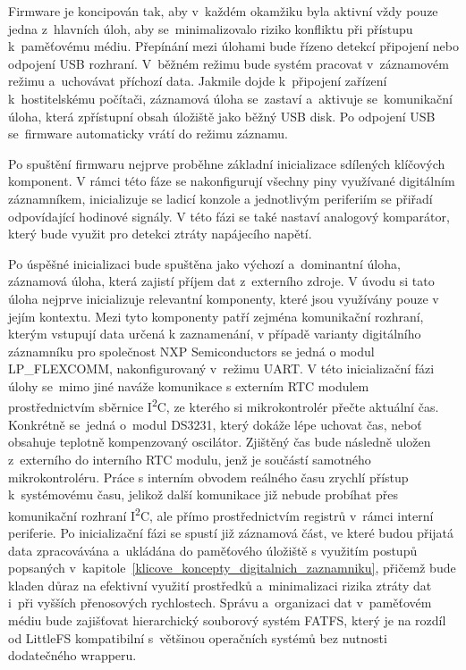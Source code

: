 Firmware je koncipován tak, aby v~každém okamžiku byla aktivní vždy pouze jedna z~hlavních úloh, aby se~minimalizovalo riziko konfliktu při přístupu k~paměťovému médiu. Přepínání mezi úlohami bude řízeno detekcí připojení nebo odpojení USB rozhraní. V~běžném režimu bude systém pracovat v~záznamovém režimu a~uchovávat příchozí data. Jakmile dojde k~připojení zařízení k~hostitelskému počítači, záznamová úloha se~zastaví a~aktivuje se~komunikační úloha, která zpřístupní obsah úložiště jako běžný USB disk. Po odpojení USB se~firmware automaticky vrátí do režimu záznamu.

Po spuštění firmwaru nejprve proběhne základní inicializace sdílených klíčových komponent. V rámci této fáze se nakonfigurují všechny piny využívané digitálním záznamníkem, inicializuje se ladicí konzole a jednotlivým periferiím se přiřadí odpovídající hodinové signály. V této fázi se také nastaví analogový komparátor, který bude využit pro detekci ztráty napájecího napětí.

Po úspěšné inicializaci bude spuštěna jako výchozí a~dominantní úloha, záznamová úloha, která zajistí příjem dat z~externího zdroje. V úvodu si tato úloha nejprve inicializuje relevantní komponenty, které jsou využívány pouze v jejím kontextu. Mezi tyto komponenty patří zejména komunikační rozhraní, kterým vstupují data určená k zaznamenání, v případě varianty digitálního záznamníku pro společnost NXP Semiconductors se jedná o modul LP\_FLEXCOMM, nakonfigurovaný v~režimu UART. V této inicializační fázi úlohy se~mimo jiné naváže komunikace s externím RTC modulem prostřednictvím sběrnice I\textsuperscript{2}C, ze kterého si mikrokontrolér přečte aktuální čas. Konkrétně se~jedná o~modul DS3231, který dokáže lépe uchovat čas, neboť obsahuje teplotně kompenzovaný oscilátor. Zjištěný čas bude následně uložen z~externího do interního RTC modulu, jenž je součástí samotného mikrokontroléru. Práce s interním obvodem reálného času zrychlí přístup k~systémovému času, jelikož další komunikace již nebude probíhat přes komunikační rozhraní I\textsuperscript{2}C, ale přímo prostřednictvím registrů v~rámci interní periferie. Po inicializační fázi se spustí již záznamová část, ve které budou přijatá data zpracovávána a~ukládána do paměťového úložiště s využitím postupů popsaných v~kapitole~\ref{klicove_koncepty_digitalnich_zaznamniku}, přičemž bude kladen důraz na efektivní využití prostředků a~minimalizaci rizika ztráty dat i~při vyšších přenosových rychlostech. Správu a~organizaci dat v~paměťovém médiu bude zajišťovat hierarchický souborový systém FATFS, který je na rozdíl od LittleFS kompatibilní s~většinou operačních systémů bez nutnosti dodatečného wrapperu.

